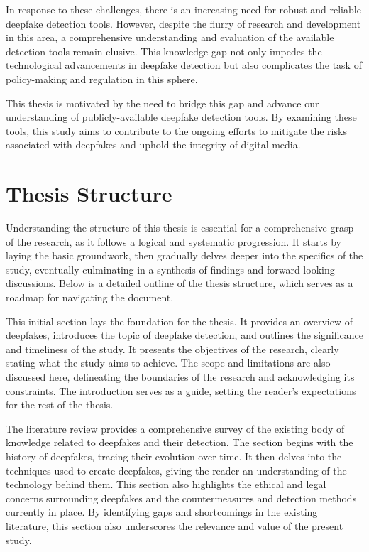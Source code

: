 In response to these challenges, there is an increasing need for robust and reliable
deepfake detection tools. However, despite the flurry of research and development in this
area, a comprehensive understanding and evaluation of the available detection tools remain
elusive. This knowledge gap not only impedes the technological advancements in deepfake
detection but also complicates the task of policy-making and regulation in this sphere.

This thesis is motivated by the need to bridge this gap and advance our understanding of
publicly-available deepfake detection tools. By examining these tools, this study aims to
contribute to the ongoing efforts to mitigate the risks associated with deepfakes and uphold
the integrity of digital media.


\section{Thesis Structure}\label{chapter:structure}
Understanding the structure of this thesis is essential for a comprehensive grasp of the 
research, as it follows a logical and systematic progression. It starts by laying the basic 
groundwork, then gradually delves deeper into the specifics of the study, eventually 
culminating in a synthesis of findings and forward-looking discussions. Below is a 
detailed outline of the thesis structure, which serves as a roadmap for navigating 
the document.

This initial section lays the foundation for the thesis. It provides an overview of deepfakes, 
introduces the topic of deepfake detection, and outlines the significance and timeliness 
of the study. It presents the objectives of the research, clearly stating what the study 
aims to achieve. The scope and limitations are also discussed here, delineating the 
boundaries of the research and acknowledging its constraints. The introduction serves 
as a guide, setting the reader's expectations for the rest of the thesis.

The literature review provides a comprehensive survey of the existing body of knowledge 
related to deepfakes and their detection. The section begins with the history of 
deepfakes, tracing their evolution over time. It then delves into the techniques used 
to create deepfakes, giving the reader an understanding of the technology behind them. 
This section also highlights the ethical and legal concerns surrounding deepfakes and 
the countermeasures and detection methods currently in place. By identifying gaps and 
shortcomings in the existing literature, this section also underscores the relevance 
and value of the present study.

